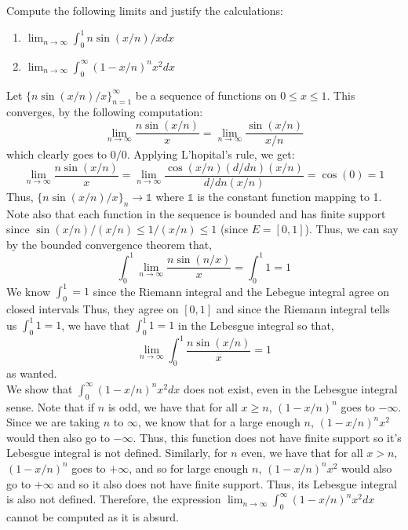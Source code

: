\documentclass[12pt]{article}
\newenvironment{solution}[2][Solution]{\begin{trivlist}
\item[\hskip \labelsep {\bfseries #1}]}{\end{trivlist}}
\newenvironment{problem}[2][Problem]{\begin{trivlist}
\item[\hskip \labelsep {\bfseries #1}\hskip \labelsep {\bfseries #2.}]}{\end{trivlist}}
\begin{document}
\begin{problem}{5}
    Compute the following limits and justify the calculations:
    \begin{enumerate}
        \item $\lim_{n\to\infty} \int_0^1 n\sin(x/n)/x dx$
        \item $\lim_{n\to\infty} \int_0^{\infty} (1-x/n)^nx^2 dx$
    \end{enumerate}
\end{problem}

\begin{solution}
    LLet $\{n\sin(x/n)/x\}_{n=1}^{\infty}$ be a sequence of functions on $0\leq x\leq1$. This converges, by the following computation:
    \[
        \lim_{n\to\infty} \frac{n\sin(x/n)}{x} = \lim_{n\to\infty} \frac{\sin(x/n)}{x/n}
    \]
    which clearly goes to $0/0$. Applying L'hopital's rule, we get:
    \[ \lim_{n\to\infty} \frac{n\sin(x/n)}{x} = \lim_{n\to\infty} \frac{\cos(x/n)(d/dn)(x/n)}{d/dn(x/n)} = \cos(0) = 1 \]
    Thus, $\{n\sin(x/n)/x\}_n \to \mathbb{1}$ where $\mathbb{1}$ is the constant function mapping to 1. Note also that each
    function in the sequence is bounded and has finite support since $\sin(x/n)/(x/n) \leq 1/(x/n) \leq 1$ (since $E = [0,1]$).
    Thus, we can say by the bounded convergence theorem that,
    \[ \int_0^1 \lim_{n\to\infty} \frac{n\sin(n/x)}{x} = \int_0^1 1 = 1\]
    We know $\int_0^1 = 1$ since the Riemann integral and the Lebegue integral agree on closed intervals 
    Thus, they agree on $[0,1]$ and since the Riemann integral tells us $\int_0^1 1 = 1$, we have 
    that $\int_0^1 1 = 1$ in the Lebesgue integral so that,
    \[ \lim_{n\to\infty} \int_0^1  \frac{n\sin(x/n)}{x} = 1 \]
    as wanted.\\

    We show that $\int_0^{\infty} (1-x/n)^nx^2dx$ does not exist, even in the Lebesgue integral sense. Note that if $n$ is odd,
    we have that for all $x\geq n$, $(1-x/n)^n$ goes to $-\infty$. Since we are taking $n$ to $\infty$, we know that for a large
    enough $n$, $(1-x/n)^nx^2$ would then also go to $-\infty$. Thus, this function does not have finite support so it's
    Lebesgue integral is not defined. Similarly, for $n$ even, we have that for all $x>n$, $(1-x/n)^n$ goes to $+\infty$, and so
    for large enough $n$, $(1-x/n)^nx^2$ would also go to $+\infty$ and so it also does not have finite support. Thus, its
    Lebesgue integral is also not defined. Therefore, the expression $\lim_{n\to\infty} \int_0^{\infty} (1-x/n)^nx^2dx$ cannot
    be computed as it is absurd.
\end{solution}
\pagebreak
\end{document}
